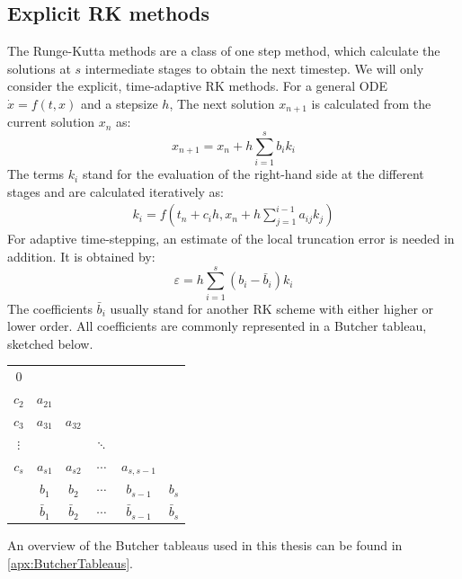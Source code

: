 \subsection{Explicit RK methods}
The Runge-Kutta methods are a class of one step method, which calculate the solutions at $s$ intermediate stages to obtain the next timestep. We will only consider the explicit, time-adaptive RK methods. For a general ODE $\dot{x} = f(t,x)$ and a stepsize $h$, The next solution $x_{n+1}$ is calculated from the current solution $x_n$ as: 
\begin{equation}
	x_{n+1}	= x_n + h\sum_{i=1}^{s}b_ik_i
\end{equation}
The terms $k_i$ stand for the evaluation of the right-hand side at the different stages and are calculated iteratively as:
\begin{align}
	k_i = f\left(t_n + c_ih, x_n + h\sum_{j=1}^{i-1}a_{ij}k_j\right)
\end{align}
For adaptive time-stepping, an estimate of the local truncation error is needed in addition. It is obtained by: 
\begin{equation}
	\varepsilon	= h\sum_{i=1}^{s}(b_i - \bar{b}_i)k_i
\end{equation}
The coefficients $\bar{b}_i$ usually stand for another RK scheme with either higher or lower order. All coefficients are commonly represented in a Butcher tableau, sketched below.
\begin{center}
\begin{tabular}{c | c c c c c }
	$0$ & & & & & \\
	$c_2$ & $a_{21}$ & & & & \\
	$c_3$ & $a_{31}$ & $a_{32}$ & & & \\  
	$\vdots$ & & & $\ddots$ & & \\
	$c_s$ & $a_{s1}$ & $a_{s2}$ & $\cdots$ & $a_{s,s-1}$ & \\ \hline
	& $b_1$ & $b_2$ & $\cdots$ & $b_{s-1}$ & $b_s$ \\ 
	& $\bar{b}_1$ & $\bar{b}_2$ & $\cdots$ & $\bar{b}_{s-1}$ & $\bar{b}_s$ 
\end{tabular}
\end{center}

An overview of the Butcher tableaus used in this thesis can be found in \autoref{apx:ButcherTableaus}.

